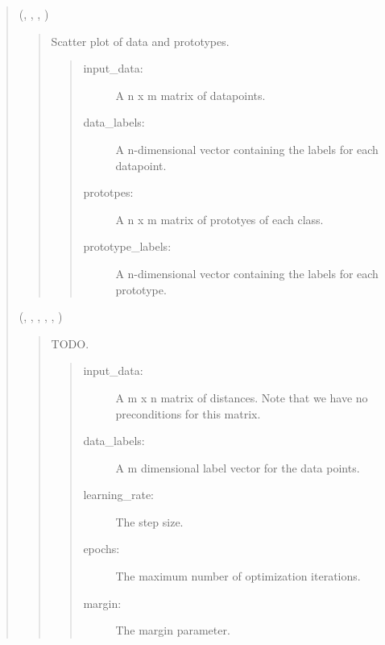 \documentclass[letterpaper,10pt,english,openany,oneside]{sphinxmanual}
\begin{document}
\begin{quote}
(, , , )
\begin{quote}

Scatter plot of data and prototypes.

\begin{quote}
\begin{description}
\item[{input\_data:}] \leavevmode
A n x m matrix of datapoints.

\item[{data\_labels:}] \leavevmode
A n-dimensional vector containing the labels for each datapoint.

\item[{prototpes:}] \leavevmode
A n x m matrix of prototyes of each class.

\item[{prototype\_labels:}] \leavevmode
A n-dimensional vector containing the labels for each prototype.

\end{description}
\end{quote}
\end{quote}

(, , , , , )
\begin{quote}

TODO.

\begin{quote}
\begin{description}
\item[{input\_data:}] \leavevmode
A m x n matrix of distances. Note that we have no preconditions for this matrix.

\item[{data\_labels:}] \leavevmode
A m dimensional label vector for the data points.

\item[{learning\_rate:}] \leavevmode
The step size.

\item[{epochs:}] \leavevmode
The maximum number of optimization iterations.

\item[{margin:}] \leavevmode
The margin parameter.


\end{description}
\end{quote}
\end{quote}
\end{quote}
\end{document}
